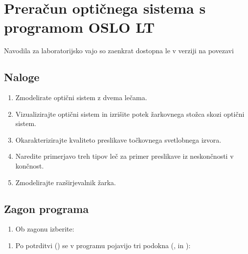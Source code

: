 \documentclass[letterpaper,10pt,english]{sphinxmanual}
\begin{document}
\chapter{Preračun optičnega sistema s programom OSLO LT}
\label{\detokenize{oslo:preracun-opticnega-sistema-s-programom-oslo-lt}}\label{\detokenize{oslo::doc}}
\sphinxAtStartPar
Navodila za laboratorijsko vajo so zaenkrat dostopna le v  verziji na povezavi 


\section{Naloge}
\label{\detokenize{oslo:naloge}}\begin{enumerate}
%
\item {} 
\sphinxAtStartPar
Zmodelirate optični sistem z dvema lečama.

\item {} 
\sphinxAtStartPar
Vizualizirajte optični sistem in izrišite potek žarkovnega stožca skozi optični sistem.

\item {} 
\sphinxAtStartPar
Okarakterizirajte kvaliteto preslikave točkovnega svetlobnega izvora.

\item {} 
\sphinxAtStartPar
Naredite primerjavo treh tipov leč za primer preslikave iz neskončnosti v končnost.

\item {} 
\sphinxAtStartPar
Zmodelirajte razširjevalnik žarka.

\end{enumerate}


\section{Zagon programa}
\label{\detokenize{oslo:zagon-programa}}\begin{enumerate}
%
\item {} 
\sphinxAtStartPar
Ob zagonu izberite:

\end{enumerate}

\begin{figure}[htbp]
\centering

\noindent{}
\end{figure}
\begin{enumerate}
%
\setcounter{enumi}{1}
\item {} 
\sphinxAtStartPar
Po potrditvi () se v programu pojavijo tri podokna (,  in ):

\end{enumerate}
\end{document}
